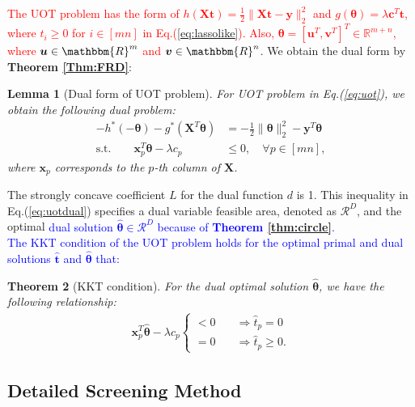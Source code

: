 \documentclass[twoside]{article}
\theoremstyle{plain}
\newtheorem{thm}{Theorem}
\newtheorem{lem}[thm]{Lemma}
\newcommand{\R}{\mathbbm{R}}
\newcommand{\mat}[1]{\mathbf{#1}}
\renewcommand{\vec}[1]{\bm{#1}}
\newcommand{\changeHK}[1]{\textcolor{red}{#1}}
\newcommand{\changeXS}[1]{\textcolor{blue}{#1}}
\begin{document}
\changeHK{The UOT problem has the form of
$h(\mat{X} \vec{t}) = \frac{1}{2}\|\mat{X} \vec{t}-\vec{y}\|_2^2$ and $g(\vec{\theta})=\lambda \vec{c}^{T}\vec{t}$, where $t_i \geq 0$ for $i \in [mn]$ in Eq.(\ref{eq:lassolike}). Also, $\vec{\theta} = [\vec{u}^T,\vec{v}^T]^T \in \mathbb{R}^{m+n}$, where $\vec{u}\in\R^{m}$ and $\vec{v}\in\R^{n}$}. We obtain the dual form by {\bf Theorem \ref{Thm:FRD}}:
\begin{lem}[Dual form of UOT problem]
For UOT problem in Eq.(\ref{eq:uot}), we obtain the following dual problem:
\begin{equation}
\begin{split}
-h^*(-\vec{\theta}) - g^*(\mat{X}^T\vec{\theta})& = -\frac{1}{2}\|\vec{\theta}\|_2^2-\vec{y}^T\vec{\theta} \\
\text{s.t.} \quad \quad \vec{x}_p^T\vec{\theta} -\lambda c_p &\leq 0, \quad \forall p \in [mn],
\end{split}
\label{eq:uotdual}
\end{equation}
where $\vec{x}_p $ corresponds to the $p$-th column of $\mat{X}$.
\end{lem}
The strongly concave coefficient $L$ for the dual function $d$ is 1. This inequality in Eq.(\ref{eq:uotdual}) specifies a dual variable feasible area, denoted as $\mathcal{R}^{D}$, and the optimal \changeXS{dual solution $\hat{\vec{\theta}} \in \mathcal{R}^{D}$ because of {\bf Theorem \ref{thm:circle}}.}\\
\changeXS{The KKT condition of the UOT problem holds for the optimal primal and dual solutions $ \hat{\vec{t}}$ and $\hat{\vec{\theta}}$ that:}
\begin{thm}[KKT condition] For the dual optimal solution $\hat{\vec{\theta}}$, we have the following relationship:
 \begin{equation}
\begin{split}
\vec{x}_p^T\hat{\vec{\theta}} -\lambda c_p \left\{
\begin{aligned}
< 0 \quad& \Rightarrow \hat{t}_p = 0\\
= 0 \quad& \Rightarrow \hat{t}_p \geq 0.
\end{aligned}
\right.
 \end{split}
 \label{eq:kkt}
\end{equation}
\end{thm}

\subsection{Detailed Screening Method}
\end{document}

